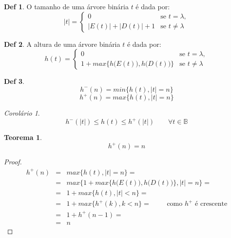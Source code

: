 \documentclass[a4paper,11pt]{article}
\theoremstyle{definition} \newtheorem{definicao}{Def}
\theoremstyle{definition} \newtheorem{exemplo}{Exemplo}
\theoremstyle{plain}      \newtheorem{teorema}{Teorema}
\theoremstyle{remark}     \newtheorem*{corolario}{Corol\'{a}rio}
\begin{document}
\begin{definicao}
O tamanho de uma \'{a}rvore bin\'{a}ria $t$ \'{e} dada por:
\begin{equation*}
|t| =
\begin{cases}
0 & \text{se } t = \lambda, \\
|E(t)| + |D(t)| + 1 & \text{se } t \neq \lambda
\end{cases}
\end{equation*}
\end{definicao}

\begin{definicao}
A altura de uma \'{a}rvore bin\'{a}ria $t$ \'{e} dada por:
\begin{equation*}
h(t) =
\begin{cases}
0 & \text{se } t = \lambda, \\
1 + max\bigg\{h\Big(E(t)\Big),h\Big(D(t)\Big)\bigg\}
& \text{se } t \neq \lambda
\end{cases}
\end{equation*}
\end{definicao}

\begin{definicao}
\begin{equation*}
h^{-}(n) = min\{h(t), |t| = n\}
\end{equation*}
\begin{equation*}
h^{+}(n) = max\{h(t), |t| = n\}
\end{equation*}
\end{definicao}

\begin{corolario}
\begin{equation*}
h^{-}(|t|) \leq h(t) \leq h^{+}(|t|) \qquad
\forall t \in \mathbb{B}
\end{equation*}
\end{corolario}

\begin{teorema}
\begin{equation*}
h^{+}(n) = n
\end{equation*}
\end{teorema}

\begin{proof}
\begin{eqnarray*}
h^{+}(n) & = & max\{h(t), |t| = n\} = \\
& = & max\Bigg\{1 + max\bigg\{h\Big(E(t)\Big),
h\Big(D(t)\Big)\bigg\}, |t| = n\Bigg\} = \\
& = & 1 + max\{h(t), |t| < n\} = \\
& = & 1 + max\{h^{+}(k), k < n\} = \qquad
\text{ como } h^{+} \text{ \'{e} crescente} \\
& = & 1 + h^{+}(n-1) = \\
& = & n
\end{eqnarray*}
\end{proof}
\end{document}
